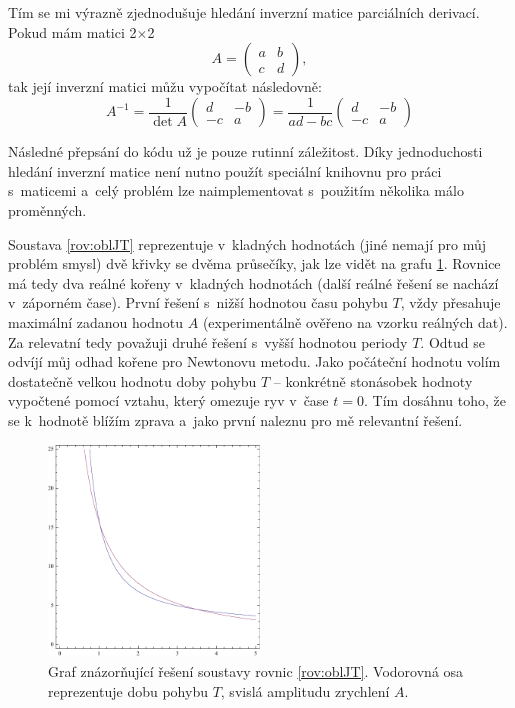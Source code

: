		Tím se mi výrazně zjednodušuje hledání inverzní matice parciálních derivací. Pokud mám matici 2$\times$2
		\begin{equation}
			A=\begin{pmatrix}
				a & b \\
				c & d
			\end{pmatrix},
		\end{equation}
		tak její inverzní matici můžu vypočítat následovně\cite{inverze}:
		\begin{equation}
		A^{-1}=\frac{1}{\det A}\begin{pmatrix}
						d & -b \\
						-c & a
					\end{pmatrix}=\frac{1}{ad-bc}\begin{pmatrix}
											d & -b \\
											-c & a
										\end{pmatrix}
		\end{equation}
		
		Následné přepsání do kódu už je pouze rutinní záležitost. Díky jednoduchosti hledání inverzní matice není nutno použít speciální knihovnu pro práci s~maticemi a~celý problém lze naimplementovat s~použitím několika málo proměnných.
		
		Soustava \ref{rov:oblJT} reprezentuje v~kladných hodnotách (jiné nemají pro můj problém smysl) dvě křivky se dvěma průsečíky, jak lze vidět na grafu \ref{graf:newton}. Rovnice má tedy dva reálné kořeny v~kladných hodnotách (další reálné řešení se nachází v~záporném čase). První řešení s~nižší hodnotou času pohybu $T$, vždy přesahuje maximální zadanou hodnotu $A$ (experimentálně ověřeno na vzorku reálných dat). Za relevatní tedy považuji druhé řešení s~vyšší hodnotou periody $T$. Odtud se odvíjí můj odhad kořene pro Newtonovu metodu. Jako počáteční hodnotu volím dostatečně velkou hodnotu doby pohybu $T$ -- konkrétně stonásobek hodnoty vypočtené pomocí vztahu, který omezuje ryv v~čase $t=0$. Tím dosáhnu toho, že se k~hodnotě blížím zprava a~jako první naleznu pro mě relevantní řešení.
		
		\begin{figure}[h]
			\centering
			\includegraphics[width=0.5\textwidth]{img/graf_newton.pdf}
			\caption{Graf znázorňující řešení soustavy rovnic \ref{rov:oblJT}. Vodorovná osa reprezentuje dobu pohybu $T$, svislá amplitudu zrychlení $A$.}\label{graf:newton}	
		\end{figure}

